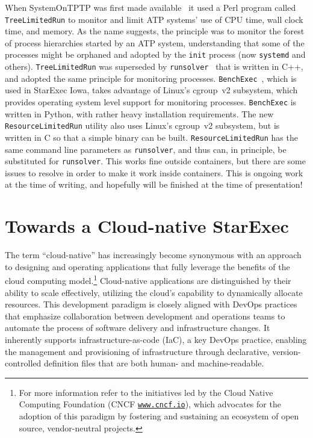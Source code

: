 \documentclass{easychair}
\begin{document}
When SystemOnTPTP was first made available~\cite{Sut07-CSR} it used a Perl program called
{\tt TreeLimitedRun} to monitor and limit ATP systems' use of CPU time, wall clock time, and 
memory.
As the name suggests, the principle was to monitor the forest of process hierarchies started by
an ATP system, understanding that some of the processes might be orphaned and adopted by the
{\tt init} process (now {\tt systemd} and others).
{\tt TreeLimitedRun} was superseded by {\tt runsolver}~\cite{Rou11} that is written in C++, and
adopted the same principle for monitoring processes.
{\tt BenchExec}~\cite{BLW19}, which is used in StarExec Iowa, takes advantage of Linux's
cgroup~v2 subsystem, which provides operating system level support for monitoring processes.
{\tt BenchExec} is written in Python, with rather heavy installation requirements.
The new {\tt ResourceLimitedRun} utility also uses Linux's cgroup~v2 subsystem, but is written
in C so that a simple binary can be built.
{\tt ResourceLimitedRun} has the same command line parameters as {\tt runsolver}, and thus
can, in principle, be substituted for {\tt runsolver}.
This works fine outside containers, but there are some issues to resolve in order to make
it work inside containers.
This is ongoing work at the time of writing, and hopefully will be finished at the time of
presentation!

\section{Towards a Cloud-native StarExec}
\label{StarExecK}

The term ``cloud-native'' has increasingly become synonymous with an approach to designing and 
operating applications that fully leverage the benefits of the cloud computing model.\footnote{%
For more information refer to the initiatives led by the Cloud Native Computing Foundation (CNCF 
\href{https://www.cncf.io/}{\tt www.cncf.io}), which advocates for the adoption of this paradigm
by fostering and sustaining an ecosystem of open source, vendor-neutral projects.}
Cloud-native applications are distinguished by their ability to scale effectively, utilizing 
the cloud's capability to dynamically allocate resources. 
This development paradigm is closely aligned with DevOps practices that emphasize collaboration 
between development and operations teams to automate the process of software delivery and 
infrastructure changes. 
It inherently supports infrastructure-as-code (IaC), a key DevOps practice, enabling the management 
and provisioning of infrastructure through declarative, version-controlled definition files that 
are both human- and machine-readable.
\end{document}
